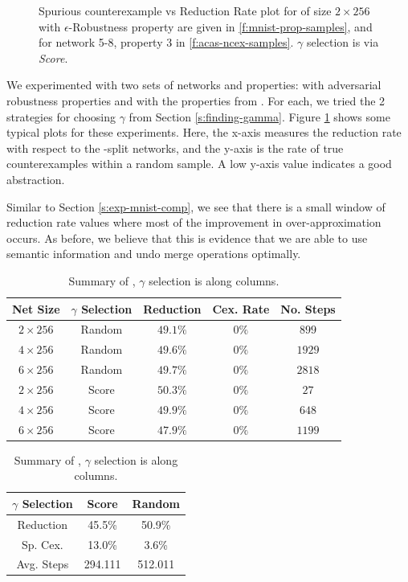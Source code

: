 \begin{figure}
    \caption{
        Spurious counterexample vs Reduction Rate plot for \mnist of size $2
        \times 256$ with $\epsilon$-Robustness property are given in 
        \ref{f:mnist-prop-samples}, and for \acasxu
        network 5-8, property 3 in \ref{f:acas-ncex-samples}.
        $\gamma$ selection is via \emph{Score}.
    }
    \label{f:ncex}
    \vspace{-0.75cm}
\end{figure}

We experimented with two sets of networks and properties: \mnist with
adversarial robustness properties and \acasxu with the properties from
\cite{reluplex}. For each, we tried the 2 strategies for choosing $\gamma$ from
Section \ref{s:finding-gamma}.
Figure \ref{f:ncex} shows some typical plots
for these experiments. Here, the x-axis measures the reduction rate with respect
to the \inc-\dec split networks, and the y-axis is the rate of true
counterexamples within a random sample. A low y-axis value indicates a good
abstraction.

Similar to Section \ref{s:exp-mnist-comp}, we see that there is a small window
of reduction rate values where most of the improvement in over-approximation
occurs. As before, we believe that this is evidence that we are able to use
semantic information and undo merge operations optimally.

\begin{table}
    \vspace{-0.75cm}
\parbox{0.60\textwidth}{
\begin{tabular}{|c|c|c|c|c|}
    \hline
    Net Size     & $\gamma$ Selection  & Reduction & Cex. Rate & No. Steps \\
    \hline
    $2\times256$ & Random              & $49.1\%$  & $  0\%$  & $ 899$    \\
    $4\times256$ & Random              & $49.6\%$  & $  0\%$  & $1929$    \\
    $6\times256$ & Random              & $49.7\%$  & $  0\%$  & $2818$    \\
    $2\times256$ & Score               & $50.3\%$  & $  0\%$  & $  27$    \\
    $4\times256$ & Score               & $49.9\%$  & $  0\%$  & $ 648$    \\
    $6\times256$ & Score               & $47.9\%$  & $  0\%$  & $1199$    \\
    \hline
\end{tabular}
\caption{Summary of \mnist Results on a single robustness property }
\label{t:mnist-prop-summary}
}
\quad
\parbox{0.30\textwidth}{
\begin{tabular}{|c|cc|}
\hline
$\gamma$ Selection  & Score   & Random  \\
\hline
Reduction  & 45.5\%  & 50.9\%  \\
Sp. Cex.   & 13.0\%  & 3.6\%   \\
Avg. Steps & 294.111 & 512.011 \\
\hline
\end{tabular}
\caption{Summary of \acasxu, $\gamma$ selection is along columns.}
\label{t:acas-ncex}
}
\vspace{-1cm}
\end{table}

